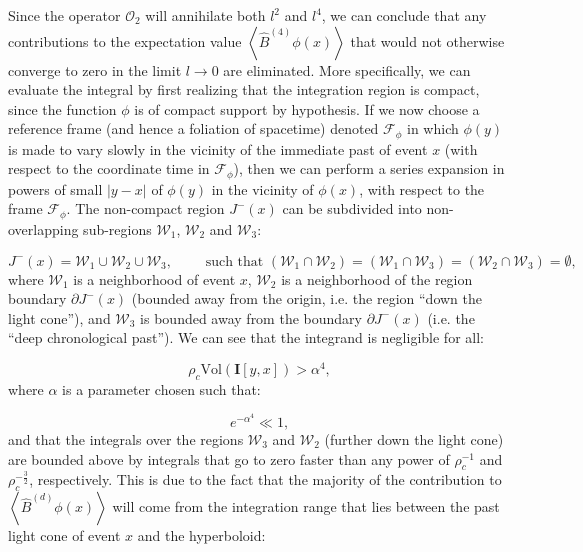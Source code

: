 \documentclass{article}
\begin{document}
Since the operator ${\mathcal{O}_2}$ will annihilate both ${l^2}$ and ${l^4}$, we can conclude that any contributions to the expectation value ${\left\langle \hat{B}^{\left( 4 \right)} \phi \left( x \right) \right\rangle}$ that would not otherwise converge to zero in the limit ${l \to 0}$ are eliminated. More specifically, we can evaluate the integral by first realizing that the integration region is compact, since the function ${\phi}$ is of compact support by hypothesis. If we now choose a reference frame (and hence a foliation of spacetime) denoted ${\mathcal{F}_{\phi}}$ in which ${\phi \left( y \right)}$ is made to vary slowly in the vicinity of the immediate past of event $x$ (with respect to the coordinate time in ${\mathcal{F}_{\phi}}$), then we can perform a series expansion in powers of small ${\left\lvert y - x \right\rvert}$ of ${\phi \left( y \right)}$ in the vicinity of ${\phi \left( x \right)}$, with respect to the frame ${\mathcal{F}_{\phi}}$. The non-compact region ${J^{-} \left( x \right)}$ can be subdivided into non-overlapping sub-regions ${\mathcal{W}_1}$, ${\mathcal{W}_2}$ and ${\mathcal{W}_3}$:

\begin{equation}
J^{-} \left( x \right) = \mathcal{W}_1 \cup \mathcal{W}_2 \cup \mathcal{W}_3, \qquad \text{ such that } \left( \mathcal{W}_1 \cap \mathcal{W}_2 \right) = \left( \mathcal{W}_1 \cap \mathcal{W}_3 \right) = \left( \mathcal{W}_2 \cap \mathcal{W}_3 \right) = \emptyset,
\end{equation}
where ${\mathcal{W}_1}$ is a neighborhood of event $x$, ${\mathcal{W}_2}$ is a neighborhood of the region boundary ${\partial J^{-} \left( x \right)}$ (bounded away from the origin, i.e. the region ``down the light cone''), and ${\mathcal{W}_3}$ is bounded away from the boundary ${\partial J^{-} \left( x \right)}$ (i.e. the ``deep chronological past''). We can see that the integrand is negligible for all:

\begin{equation}
\rho_c \mathrm{Vol} \left( \mathbf{I} \left[ y, x \right] \right) > \alpha^4,
\end{equation}
where ${\alpha}$ is a parameter chosen such that:

\begin{equation}
e^{- \alpha^4} \ll 1,
\end{equation}
and that the integrals over the regions ${\mathcal{W}_3}$ and ${\mathcal{W}_2}$ (further down the light cone) are bounded above by integrals that go to zero faster than any power of ${\rho_{c}^{-1}}$ and ${\rho_{c}^{- \frac{3}{2}}}$, respectively. This is due to the fact that the majority of the contribution to ${\left\langle \hat{B}^{\left( d \right)} \phi \left( x \right) \right\rangle}$ will come from the integration range that lies between the past light cone of event $x$ and the hyperboloid:
\end{document}
